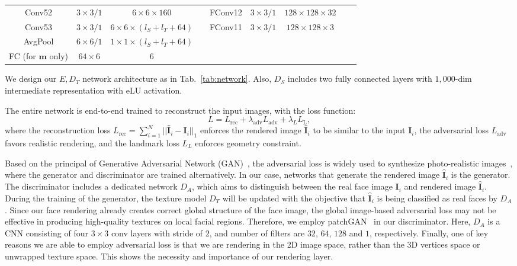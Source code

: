 \begin{table}[t!]
\begin{center}
{\begin{tabular}{ @{}ccccccccc@{} }
Conv52 & $3{\times}3/1$ & $6{\times}6{\times}160$ && FConv12& $3{\times}3/1$ & $128{\times}128{\times}32$ \\
Conv53 & $3{\times}3/1$ & $6{\times}6{\times}(l_S{+}l_T{+}64)$ && FConv11& $3{\times}3/1$ & $128{\times}128{\times}3$ \\
\midrule
AvgPool& $6{\times}6/1$ & $1{\times}1{\times}(l_S{+}l_T{+}64)$ && \\ \midrule
FC (for $\mathbf{m}$ only) & $64{\times}6$& $6$ \\ \bottomrule
\end{tabular}}
\vspace{-6mm}
\end{center}
\end{table}


We design our $E, D_T$ network architecture as in Tab.~\ref{tab:network}. Also, $D_S$ includes two fully connected layers with \mbox{$1,000$-dim} intermediate representation with eLU activation.

The entire network is end-to-end trained to reconstruct the input images, with the loss function:
\begin{equation}
L = L_{\text{rec}} + \lambda_{ \text{adv} } L_{ \text{adv} } +  \lambda_L L_{\text{L}},
\label{tab:overallLoss}
\end{equation}
where the reconstruction loss $L_{\text{rec}} = \sum_{i=1}^{N}||\mathbf{\hat{I}}_i - \mathbf{I}_i||_1$ enforces the rendered image $\mathbf{\hat{I}}_i$ to be similar to the input $\mathbf{I}_i$, the adversarial loss $L_{ \text{adv} }$ favors realistic rendering, and the landmark loss $L_L$ enforces geometry constraint.

Based on the principal of Generative Adversarial Network (GAN)~\cite{goodfellow2014generative}, the adversarial loss is widely used to synthesize photo-realistic images~\cite{radford2015unsupervised, tran2017disentangled, tran2018representation}, where the generator and discriminator are trained alternatively.
In our case, networks that generate the rendered image $\mathbf{\hat{I}}_i$ is the generator.
The discriminator includes a dedicated network $D_A$, which aims to distinguish between the real face image $\mathbf{I}_i$ and rendered image $\mathbf{\hat{I}}_i$.
During the training of the generator, the texture model $D_T$ will be updated with the objective that $\mathbf{\hat{I}}_i$ is being classified as real faces by $D_A$.
%
Since our face rendering already creates correct global structure of the face image, the global image-based adversarial loss may not be effective in producing high-quality textures on local facial regions.
Therefore, we employ patchGAN~\cite{shrivastava2017learning} in our discriminator.
%
Here, $D_A$ is a CNN consisting of four $3\times3$ conv layers with stride of $2$, and number of filters are $32$, $64$, $128$ and $1$, respectively. 
%
Finally, one of key reasons we are able to employ adversarial loss is that we are rendering in the 2D image space, rather than the 3D vertices space or unwrapped texture space.
This shows the necessity and importance of our rendering layer. 
 
